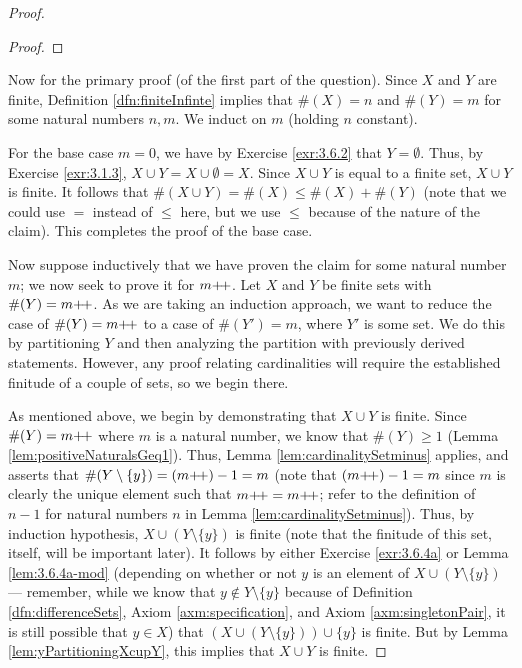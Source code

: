 \documentclass[../main.tex]{subfiles}
\begin{document}
\begin{enumerate}[ref={\thesection.\arabic*}]
\begin{prp}
\begin{enumerate}[label={\textup{(}\alph*\textup{)}},ref={\theenumi\alph*}]
\begin{proof}
\begin{lem}
\begin{proof}
                    \end{proof}
                \end{lem}
                Now for the primary proof (of the first part of the question). Since $X$ and $Y$ are finite, Definition \ref{dfn:finiteInfinte} implies that $\#(X)=n$ and $\#(Y)=m$ for some natural numbers $n,m$. We induct on $m$ (holding $n$ constant).\par
                For the base case $m=0$, we have by Exercise \ref{exr:3.6.2} that $Y=\emptyset$. Thus, by Exercise \ref{exr:3.1.3}, $X\cup Y=X\cup\emptyset=X$. Since $X\cup Y$ is equal to a finite set, $X\cup Y$ is finite. It follows that $\#(X\cup Y)=\#(X)\leq\#(X)+\#(Y)$ (note that we could use $=$ instead of $\leq$ here, but we use $\leq$ because of the nature of the claim). This completes the proof of the base case.\par
                Now suppose inductively that we have proven the claim for some natural number $m$; we now seek to prove it for $m{+\!+}$. Let $X$ and $Y$ be finite sets with $\#(Y)=m{+\!+}$. As we are taking an induction approach, we want to reduce the case of $\#(Y)=m{+\!+}$ to a case of $\#(Y')=m$, where $Y'$ is some set. We do this by partitioning $Y$ and then analyzing the partition with previously derived statements. However, any proof relating cardinalities will require the established finitude of a couple of sets, so we begin there.\par
                As mentioned above, we begin by demonstrating that $X\cup Y$ is finite. Since $\#(Y)=m{+\!+}$ where $m$ is a natural number, we know that $\#(Y)\geq 1$ (Lemma \ref{lem:positiveNaturalsGeq1}). Thus, Lemma \ref{lem:cardinalitySetminus} applies, and asserts that $\#(Y\setminus\{y\})=(m{+\!+})-1=m$ (note that $(m{+\!+})-1=m$ since $m$ is clearly the unique element such that $m{+\!+}=m{+\!+}$; refer to the definition of $n-1$ for natural numbers $n$ in Lemma \ref{lem:cardinalitySetminus}). Thus, by induction hypothesis, $X\cup(Y\setminus\{y\})$ is finite (note that the finitude of this set, itself, will be important later). It follows by either Exercise \ref{exr:3.6.4a} or Lemma \ref{lem:3.6.4a-mod} (depending on whether or not $y$ is an element of $X\cup(Y\setminus\{y\})$ --- remember, while we know that $y\notin Y\setminus\{y\}$ because of Definition \ref{dfn:differenceSets}, Axiom \ref{axm:specification}, and Axiom \ref{axm:singletonPair}, it is still possible that $y\in X$) that $(X\cup(Y\setminus\{y\}))\cup\{y\}$ is finite. But by Lemma \ref{lem:yPartitioningXcupY}, this implies that $X\cup Y$ is finite.\par

\end{proof}
\end{enumerate}
\end{prp}
\end{enumerate}
\end{document}

